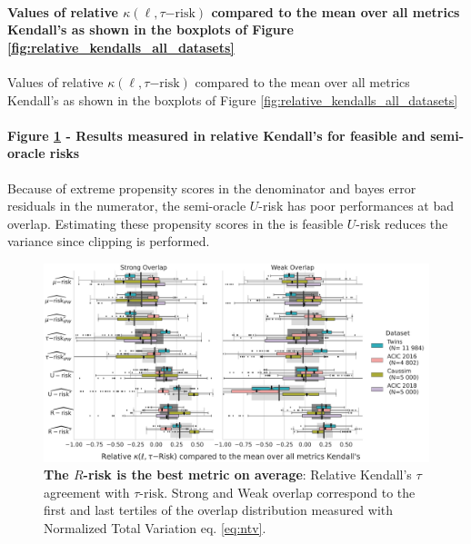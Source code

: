 \documentclass[a4paper,num-refs]{oup-contemporary}%
\begin{document}
\paragraph{Values of relative $\kappa(\ell,\tau\mathrm{{-risk}})$ compared to
    the mean over all metrics Kendall's as shown in the boxplots of Figure \ref{fig:relative_kendalls_all_datasets}}

\begin{table}
    \centering
    \resizebox{0.7\textwidth}{!}{
        
    }
    \caption{Values of relative $\kappa(\ell,\tau\mathrm{{-risk}})$ compared to
        the mean over all metrics Kendall's as shown in the boxplots of Figure
        \ref{fig:relative_kendalls_all_datasets}}\label{apd:table:relative_kendalls_all_datasets}
\end{table}


\paragraph{Figure \ref{apd:fig:relative_kendalls_all_datasets_all_metrics} -
    Results measured in relative Kendall's for feasible and semi-oracle risks}

Because of extreme propensity scores in the denominator and bayes error residuals in the numerator, the semi-oracle
$U$-risk has poor performances at bad overlap. Estimating these propensity scores in the is feasible $U$-risk reduces
the variance since clipping is performed.

\begin{figure}[!b]
    \centering
    \includegraphics[width=\linewidth]{_1_r_risk_domination_mrisks_by_ds.pdf}
    \caption{\textbf{The $R$-risk is the best metric on average}: Relative Kendall's $\tau$
        agreement with $\tau\text{-risk}$. Strong and Weak overlap correspond to
        the first and last tertiles of the overlap distribution measured with
        Normalized Total Variation eq. \ref{eq:ntv}.
    }\label{apd:fig:relative_kendalls_all_datasets_all_metrics}
\end{figure}
\end{document}
